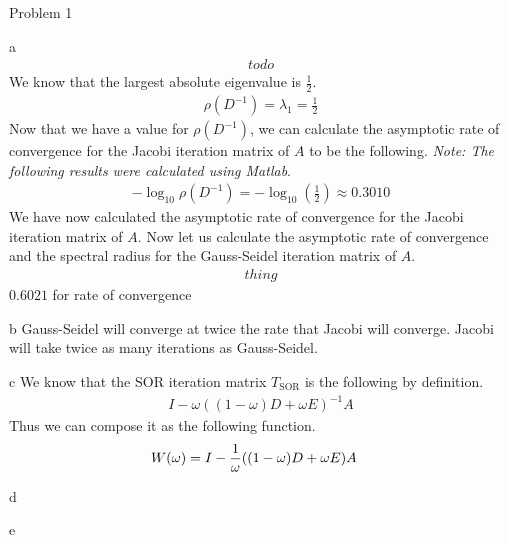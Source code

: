 \begin{section}{Problem 1}
\begin{solution}{a}
        \begin{align*}
            todo
        \end{align*}
        We know that the largest absolute eigenvalue is $\frac{1}{2}$.
        \begin{align*}
            \rho \left( D^{-1} \right) = \lambda_1 = \frac{1}{2}
        \end{align*}
        Now that we have a value for $\rho \left( D^{-1} \right)$, we can calculate the asymptotic rate of convergence for the Jacobi iteration matrix of $A$ to be the following. \textit{Note: The following results were calculated using Matlab}.
        \begin{align*}
            - \log_{10} \rho \left( D^{-1} \right) = - \log_{10} \left( \frac{1}{2} \right) \approx 0.3010
        \end{align*}
        We have now calculated the asymptotic rate of convergence for the Jacobi iteration matrix of $A$. Now let us calculate the asymptotic rate of convergence and the spectral radius for the Gauss-Seidel iteration matrix of $A$.
        \begin{align*}
            thing
        \end{align*}
        $0.6021$ for rate of convergence 
    \end{solution}

    \newpage

    \begin{solution}{b}
        Gauss-Seidel will converge at twice the rate that Jacobi will converge. Jacobi will take twice as many iterations as Gauss-Seidel.
    \end{solution}

    \newpage

    \begin{solution}{c}
        We know that the SOR iteration matrix $T_\text{SOR}$ is the following by definition.
        \begin{align*}
            I - \omega ((1 - \omega)D + \omega E)^{-1} A
        \end{align*}
        Thus we can compose it as the following function.
        \begin{align*}
            \boldmath{W}(\omega) &= I - \frac{1}{\omega} ((1 - \omega)D + \omega E) A
        \end{align*}
    \end{solution}

    \newpage

    \begin{solution}{d}
    \end{solution}

    \newpage 

    \begin{solution}{e}
    \end{solution}

\end{section}